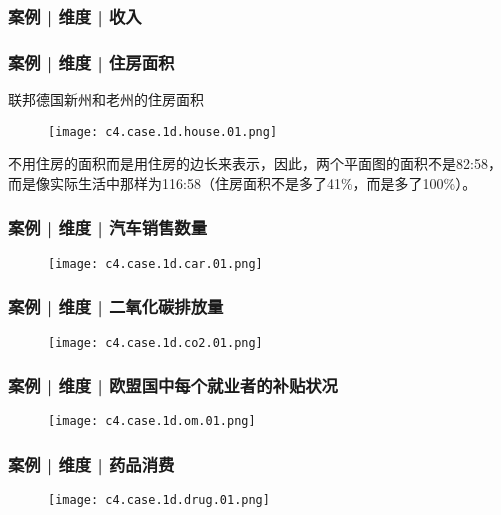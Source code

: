 \begin{frame}
  \frametitle{案例 | 维度 | 收入}
  \begin{figure}
    \centering
  \end{figure}
\end{frame}

\begin{frame}
  \frametitle{案例 | 维度 | 住房面积}
  \begin{block}{联邦德国新州和老州的住房面积}
    \begin{figure}
      \centering
      \texttt{[image: c4.case.1d.house.01.png]}
    \end{figure}
    \vspace{-0.5em}
    不用住房的面积而是用住房的边长来表示，因此，两个平面图的面积不是82:58，而是像实际生活中那样为116:58（住房面积不是多了41\%，而是多了100\%）。
  \end{block}
\end{frame}

\begin{frame}
  \frametitle{案例 | 维度 | 汽车销售数量}
  \begin{figure}
    \centering
    \texttt{[image: c4.case.1d.car.01.png]}
  \end{figure}
\end{frame}

\begin{frame}
  \frametitle{案例 | 维度 | 二氧化碳排放量}
  \begin{figure}
    \centering
    \texttt{[image: c4.case.1d.co2.01.png]}
  \end{figure}
\end{frame}

\begin{frame}
  \frametitle{案例 | 维度 | 欧盟国中每个就业者的补贴状况}
  \begin{figure}
    \centering
    \texttt{[image: c4.case.1d.om.01.png]}
  \end{figure}
\end{frame}

\begin{frame}
  \frametitle{案例 | 维度 | 药品消费}
  \begin{figure}
    \centering
    \texttt{[image: c4.case.1d.drug.01.png]}
  \end{figure}
\end{frame}

